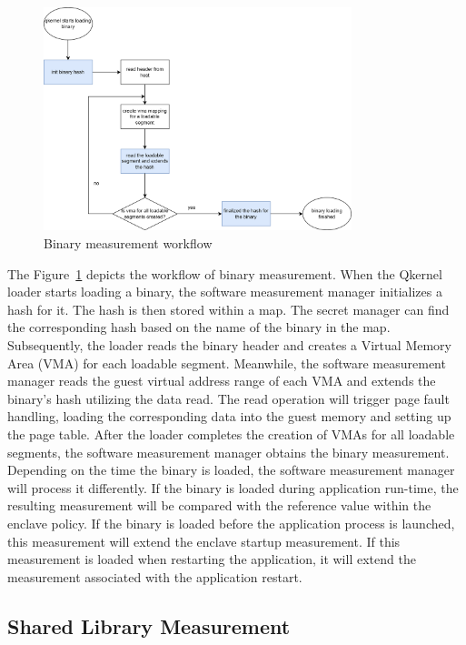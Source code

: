 \begin{figure}[htp]
    \centering
    \includegraphics[width=0.8\textwidth]{images/measure_binary.png}
    \caption[Binary measurement workflow]{Binary measurement workflow}
    \label{fig:binary_measurement}
\end{figure}


The Figure~\ref{fig:binary_measurement} depicts the workflow of binary measurement. When the Qkernel loader starts loading a binary, the software measurement manager initializes a hash for it. The hash is then stored within a map. The secret manager can find the corresponding hash based on the name of the binary in the map. 
Subsequently, the loader reads the binary header and creates a Virtual Memory Area (VMA) for each loadable segment. Meanwhile, the software measurement manager reads the guest virtual address range of each VMA and extends the binary's hash utilizing the data read.
The read operation will trigger page fault handling, loading the corresponding data into the guest memory and setting up the page table. After the loader completes the creation of VMAs for all loadable segments, the software measurement manager obtains the binary measurement. Depending on the time the 
binary is loaded, the software measurement manager will process it differently. If the binary is loaded during application run-time, the resulting measurement will be compared with the reference value within the enclave policy. If the binary is loaded before the application process is launched, this 
measurement will extend the enclave startup measurement. If this measurement is loaded when restarting the application, it will extend the measurement associated with the application restart.

\subsection{Shared Library Measurement}

